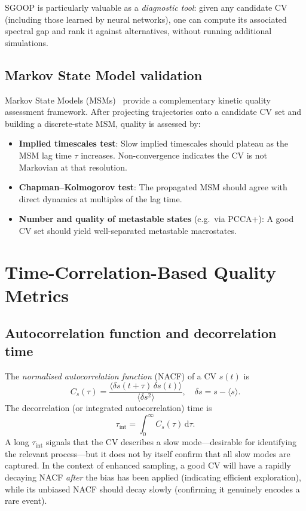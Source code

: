 \documentclass[12pt, a4paper]{article}
\begin{document}
SGOOP is particularly valuable as a \emph{diagnostic tool}: given any 
candidate CV (including those learned by neural networks), one can 
compute its associated spectral gap and rank it against alternatives, 
without running additional simulations.

\subsection{Markov State Model validation}

Markov State Models (MSMs)~\citep{Pande2010} provide a complementary 
kinetic quality assessment framework.  After projecting trajectories 
onto a candidate CV set and building a discrete-state MSM, quality is 
assessed by:
\begin{itemize}[noitemsep]
  \item \textbf{Implied timescales test}: Slow implied timescales should 
        plateau as the MSM lag time $\tau$ increases.  Non-convergence 
        indicates the CV is not Markovian at that resolution.
  \item \textbf{Chapman--Kolmogorov test}: The propagated MSM should 
        agree with direct dynamics at multiples of the lag time.
  \item \textbf{Number and quality of metastable states} (e.g.\ via 
        PCCA+): A good CV set should yield well-separated metastable 
        macrostates.
\end{itemize}

\section{Time-Correlation-Based Quality Metrics}
\label{sec:correlation}

\subsection{Autocorrelation function and decorrelation time}

The \emph{normalised autocorrelation function} (NACF) of a CV 
$s(t)$ is
\begin{equation}
  C_s(\tau) = \frac{\langle \delta s(t+\tau)\,\delta s(t)\rangle}
                   {\langle \delta s^2\rangle},
  \quad \delta s = s - \langle s \rangle.
\end{equation}
The decorrelation (or integrated autocorrelation) time is
\begin{equation}
  \tau_{\mathrm{int}} = \int_0^\infty C_s(\tau)\,\mathrm{d}\tau.
\end{equation}
A long $\tau_{\mathrm{int}}$ signals that the CV describes a slow 
mode---desirable for identifying the relevant process---but it does not 
by itself confirm that all slow modes are captured.  In the context of 
enhanced sampling, a good CV will have a rapidly decaying NACF 
\emph{after} the bias has been applied (indicating efficient exploration), 
while its unbiased NACF should decay slowly (confirming it genuinely 
encodes a rare event).
\end{document}
